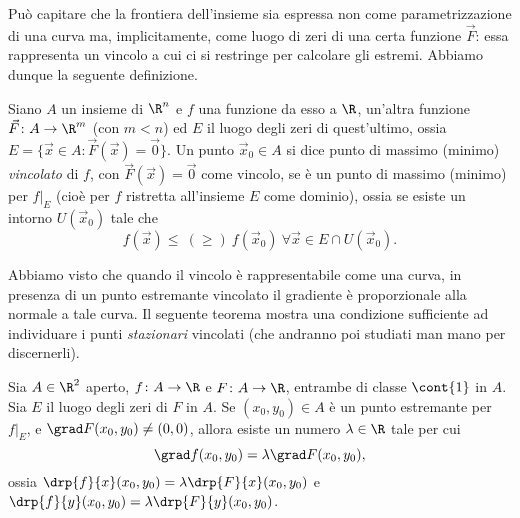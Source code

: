 Può capitare che la frontiera dell'insieme sia espressa non come parametrizzazione di una curva ma, implicitamente, come luogo di zeri di una certa funzione $\vec F$: essa rappresenta un vincolo a cui ci si restringe per calcolare gli estremi. Abbiamo dunque la seguente definizione.
\begin{definizione} \label{d:estremi-vincolati}
	Siano $A$ un insieme di $\R^n$ e $f$ una funzione da esso a $\R$, un'altra funzione $\vec F\colon A\to\R^m$ (con $m<n$) ed $E$ il luogo degli zeri di quest'ultimo, ossia $E=\{\vec x\in A\colon \vec F(\vec x)=\vec 0\}$.
	Un punto $\vec x_0\in A$ si dice punto di massimo (minimo) \emph{vincolato} di $f$, con $\vec F(\vec x)=\vec 0$ come vincolo, se è un punto di massimo (minimo) per $f|_E$ (cioè per $f$ ristretta all'insieme $E$ come dominio), ossia se esiste un intorno $U(\vec x_0)$ tale che
	\begin{equation*}
		f(\vec x)\leq\ (\geq)\ f(\vec x_0)\ \forall\vec x\in E\cap U(\vec x_0).
	\end{equation*}
\end{definizione}
Abbiamo visto che quando il vincolo è rappresentabile come una curva, in presenza di un punto estremante vincolato il gradiente è proporzionale alla normale a tale curva.
Il seguente teorema mostra una condizione sufficiente ad individuare i punti \emph{stazionari} vincolati (che andranno poi studiati man mano per discernerli).
\begin{teorema} \label{t:moltiplicatori-lagrange}
	Sia $A\in\R^2$ aperto, $f\colon A\to\R$ e $F\colon A\to\R$, entrambe di classe $\cont{1}$ in $A$. Sia $E$ il luogo degli zeri di $F$ in $A$. Se $(x_0,y_0)\in A$ è un punto estremante per $f|_E$, e $\grad F(x_0,y_0)\neq(0,0)$, allora esiste un numero $\lambda\in\R$ tale per cui
	\begin{equation} 
		\grad f(x_0,y_0)=\lambda\grad F(x_0,y_0),
		\label{eq:moltiplicatori-lagrange-R2}
	\end{equation}
	ossia $\drp{f}{x}(x_0,y_0)=\lambda\drp{F}{x}(x_0,y_0)$ e $\drp{f}{y}(x_0,y_0)=\lambda\drp{F}{y}(x_0,y_0)$.
\end{teorema}
